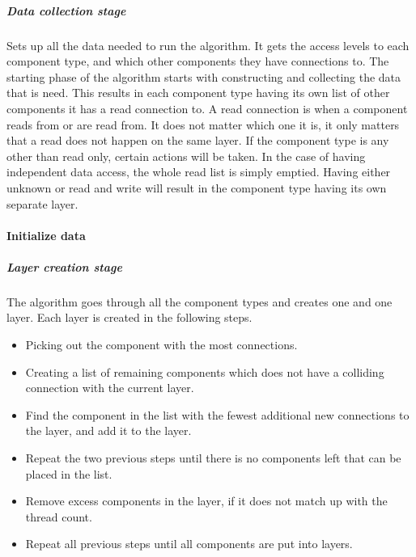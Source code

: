 \subparagraph{Data collection stage}
Sets up all the data needed to run the algorithm.
It gets the access levels to each component type, and which other components they have connections to.
The starting phase of the algorithm starts with constructing and collecting the data that is need.
This results in each component type having its own list of other components it has a read connection to.
A read connection is when a component reads from or are read from.
It does not matter which one it is, it only matters that a read does not happen on the same layer.
If the component type is any other than read only, certain actions will be taken.
In the case of having independent data access, the whole read list is simply emptied.
Having either unknown or read and write will result in the component type having its own separate layer.

\paragraph{Initialize data}


\subparagraph{Layer creation stage}
The algorithm goes through all the component types and creates one and one layer.
Each layer is created in the following steps.

\begin{itemize}
    \item Picking out the component with the most connections.

    \item Creating a list of remaining components which does not have a colliding connection with the current layer.
    
    \item Find the component in the list with the fewest additional new connections to the layer, and add it to the layer.
    
    \item Repeat the two previous steps until there is no components left that can be placed in the list.
    
    \item Remove excess components in the layer, if it does not match up with the thread count.
    
    \item Repeat all previous steps until all components are put into layers.
\end{itemize}

